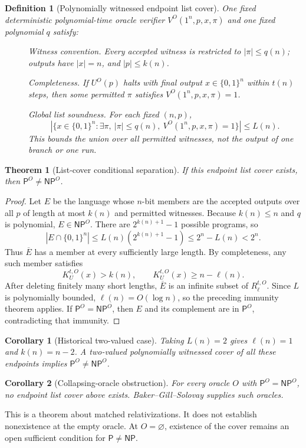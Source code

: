 \documentclass[11pt]{article}
\newtheorem{definition}{Definition}
\newtheorem{theorem}{Theorem}
\newtheorem{corollary}{Corollary}
\newcommand{\PP}{\mathsf P}
\newcommand{\NP}{\mathsf{NP}}
\begin{document}
\begin{definition}[Polynomially witnessed endpoint list cover]
One fixed deterministic polynomial-time oracle verifier
$V^O(1^n,p,x,\pi)$ and one fixed polynomial $q$ satisfy:
\begin{description}
\item[] \emph{Witness convention.} Every accepted witness is restricted
to $|\pi|\le q(n)$; outputs have $|x|=n$, and $|p|\le k(n)$.
\item[] \emph{Completeness.} If $U^O(p)$ halts with final output
$x\in\{0,1\}^n$ within $t(n)$ steps, then some permitted $\pi$
satisfies $V^O(1^n,p,x,\pi)=1$.
\item[] \emph{Global list soundness.} For each fixed $(n,p)$,
\[
 \left|\{x\in\{0,1\}^n:\exists \pi,\ |\pi|\le q(n),\
                 V^O(1^n,p,x,\pi)=1\}\right|\le L(n).
\]
This bounds the union over all permitted witnesses, not the output of
one branch or one run.
\end{description}
\end{definition}

\begin{theorem}[List-cover conditional separation]
If this endpoint list cover exists, then $\PP^O\ne\NP^O$.
\end{theorem}
\begin{proof}
Let $E$ be the language whose $n$-bit members are the accepted outputs
over all $p$ of length at most $k(n)$ and permitted witnesses.
Because $k(n)\le n$ and $q$ is polynomial, $E\in\NP^O$.
There are $2^{k(n)+1}-1$ possible programs, so
\[
 |E\cap\{0,1\}^n|
 \le L(n)(2^{k(n)+1}-1)
 \le 2^n-L(n)<2^n.
\]
Thus $\overline E$ has a member at every sufficiently large length.
By completeness, any such member satisfies
\[
 K_U^{t,O}(x)>k(n),\qquad
 K_U^{t,O}(x)\ge n-\ell(n).
\]
After deleting finitely many short lengths, $\overline E$ is an infinite
subset of $R_\ell^{t,O}$. Since $L$ is polynomially bounded,
$\ell(n)=O(\log n)$, so the preceding immunity theorem applies.
If $\PP^O=\NP^O$, then $E$ and its complement are in $\PP^O$,
contradicting that immunity.
\end{proof}

\begin{corollary}[Historical two-valued case]
Taking $L(n)=2$ gives $\ell(n)=1$ and $k(n)=n-2$.
A two-valued polynomially witnessed cover of all these endpoints implies
$\PP^O\ne\NP^O$.
\end{corollary}
\begin{corollary}[Collapsing-oracle obstruction]
For every oracle $O$ with $\PP^O=\NP^O$, no endpoint list cover above
exists. Baker--Gill--Solovay \cite{bgs1975} supplies such oracles.
\end{corollary}
This is a theorem about matched relativizations. It does not establish
nonexistence at the empty oracle. At $O=\varnothing$, existence of the
cover remains an open sufficient condition for $\PP\ne\NP$.
\end{document}

